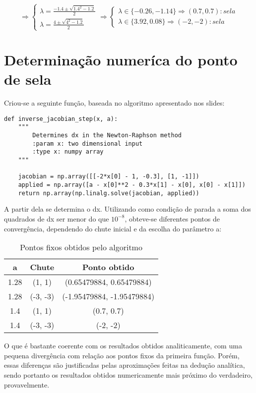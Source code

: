 \documentclass{article}[twocolumn]
\begin{document}
	\begin{equation}
		\Rightarrow
		\left\{\begin{array}{l}
			\lambda = \frac{-1.4 \pm \sqrt{1.4^{2} - 1.2}}{2}\\
			\lambda = \frac{4 \pm \sqrt{4^{2} - 1.2}}{2}
		\end{array}\right.
		\Rightarrow
		\left\{\begin{array}{l}
			\lambda \in \{-0.26, -1.14\} \Rightarrow (0.7, 0.7): sela\\
			\lambda \in \{3.92, 0.08\} \Rightarrow (-2, -2): sela
		\end{array}\right.
		\nonumber
	\end{equation}
	\section{Determina\c{c}\~ao numer\'ica do ponto de sela}
	Criou-se a seguinte fun\c{c}\~ao, baseada no algoritmo apresentado nos slides:
	\begin{verbatim}
def inverse_jacobian_step(x, a):
    """
        Determines dx in the Newton-Raphson method
        :param x: two dimensional input
        :type x: numpy array
    """
    
    jacobian = np.array([[-2*x[0] - 1, -0.3], [1, -1]])
    applied = np.array([a - x[0]**2 - 0.3*x[1] - x[0], x[0] - x[1]])
    return np.array(np.linalg.solve(jacobian, applied))
	\end{verbatim}
	A partir dela se determina o dx. Utilizando como condi\c{c}\~ao de parada
	a soma dos quadrados de dx ser menor do que $10^{-8}$, obteve-se diferentes pontos
	de converg\^encia, dependendo do chute inicial e da escolha do par\^ametro a:
	\begin{table}[H]
		\centering
		\begin{tabular}{ccc}
			\hline
			a & Chute & Ponto obtido\\
			\hline
			1.28 & (1, 1) & (0.65479884, 0.65479884)\\
			1.28 & (-3, -3) & (-1.95479884, -1.95479884)\\
			1.4 & (1, 1) & (0.7, 0.7)\\
			1.4 & (-3, -3) & (-2, -2)\\
			\hline
		\end{tabular}
		\caption{Pontos fixos obtidos pelo algoritmo}
		\label{tab:newton-raphson}
	\end{table}
	O que \'e bastante coerente com os resultados obtidos analiticamente, com uma pequena
	diverg\^encia com rela\c{c}\~ao aos pontos fixos da primeira fun\c{c}\~ao. Por\'em,
	essas diferen\c{c}as s\~ao justificadas pelas aproxima\c{c}\~oes feitas na dedu\c{c}\~ao
	anal\'itica, sendo portanto os resultados obtidos numericamente mais pr\'oximo do
	verdadeiro, provavelmente.
\end{document}
